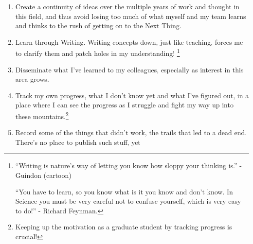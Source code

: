 \begin{enumerate}

\item Create a continuity of ideas over the multiple years of work and thought in this field, and thus avoid losing too much of what myself and my team learns and thinks to the rush of getting on to the Next Thing.

\item Learn through Writing. Writing concepts down, just like teaching, forces me to clarify them and patch holes in my understanding! \footnote{``Writing is nature's way of letting you know how sloppy your thinking is.'' - Guindon (cartoon)

``You have to learn, so you know what is it you know and don't know. In Science you must be very careful not to confuse yourself, which is very easy to do!'' - Richard Feynman.} 

\item Disseminate what I've learned to my colleagues, especially as interest in this area grows.

\item Track my own progress, what I don't know yet and what I've figured out, in a place where I can see the progress as I struggle and fight my way up into these mountains.\footnote{Keeping up the motivation as a graduate student by tracking progress is crucial!}

\item Record some of the things that didn't work, the trails that led to a dead end. There's no place to publish such stuff, yet 

\end{enumerate}